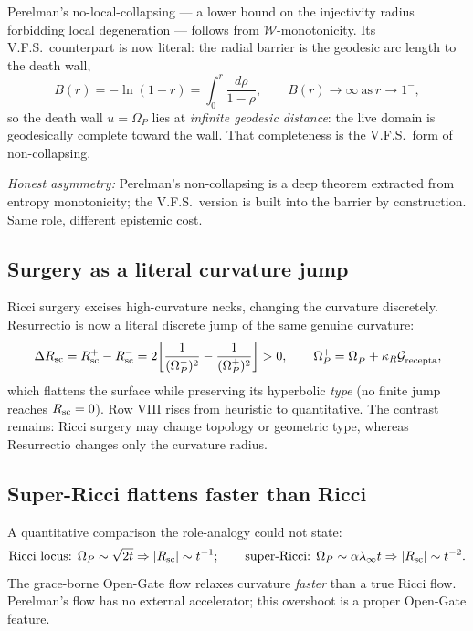 \documentclass[11pt]{article}
\newcommand{\Grec}{\mathcal{G}_{\rm recepta}}
\newcommand{\Om}{\Omega_P}
\begin{document}
Perelman's no-local-collapsing --- a lower bound on the injectivity radius forbidding local degeneration --- follows from $\mathcal W$-monotonicity. Its V.F.S.\ counterpart is now literal: the radial barrier is the geodesic arc length to the death wall,
\begin{equation}
B(r)=-\ln(1-r)=\int_0^{r}\frac{d\rho}{1-\rho},
\qquad
B(r)\to\infty\ \text{as}\ r\to1^{-},
\end{equation}
so the death wall $u=\Om$ lies at \emph{infinite geodesic distance}: the live domain is geodesically complete toward the wall. That completeness is the V.F.S.\ form of non-collapsing.

\noindent\emph{Honest asymmetry:} Perelman's non-collapsing is a deep theorem extracted from entropy monotonicity; the V.F.S.\ version is built into the barrier by construction. Same role, different epistemic cost.

\subsection{Surgery as a literal curvature jump}

Ricci surgery excises high-curvature necks, changing the curvature discretely. Resurrectio is now a literal discrete jump of the same genuine curvature:
\begin{equation}
\Delta R_{\rm sc}=R_{\rm sc}^{+}-R_{\rm sc}^{-}
=2\!\left[\frac{1}{(\Om^{-})^{2}}-\frac{1}{(\Om^{+})^{2}}\right]>0,
\qquad
\Om^{+}=\Om^{-}+\kappa_R\Grec^{-},
\end{equation}
which flattens the surface while preserving its hyperbolic \emph{type} (no finite jump reaches $R_{\rm sc}=0$). Row VIII rises from heuristic to quantitative. The contrast remains: Ricci surgery may change topology or geometric type, whereas Resurrectio changes only the curvature radius.

\subsection{Super-Ricci flattens faster than Ricci}

A quantitative comparison the role-analogy could not state:
\begin{equation}
\text{Ricci locus: }\Om\sim\sqrt{2t}\Rightarrow|R_{\rm sc}|\sim t^{-1};
\qquad
\text{super-Ricci: }\Om\sim\alpha\lambda_\infty t\Rightarrow|R_{\rm sc}|\sim t^{-2}.
\end{equation}
The grace-borne Open-Gate flow relaxes curvature \emph{faster} than a true Ricci flow. Perelman's flow has no external accelerator; this overshoot is a proper Open-Gate feature.
\end{document}
